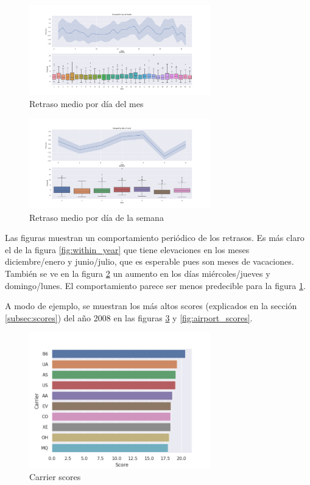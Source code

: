 \begin{figure}[hbtp]
  \centering
  \includegraphics[width=0.7\textwidth]{plots/within_month.png}
  \caption{Retraso medio por d\'ia del mes}
  \label{fig:within_month}
\end{figure}

\begin{figure}[hbtp]
  \centering
  \includegraphics[width=0.7\textwidth]{plots/within_week.png}
  \caption{Retraso medio por d\'ia de la semana}
  \label{fig:within_week}
\end{figure}

Las figuras muestran un comportamiento peri\'odico de los retrasos. Es m\'as claro el de la figura \ref{fig:within_year}
que tiene elevaciones en los meses diciembre/enero y junio/julio, que es esperable pues son
meses de vacaciones. Tambi\'en se ve en la figura \ref{fig:within_week} un aumento en los d\'ias mi\'ercoles/jueves
y domingo/lunes. El comportamiento parece ser menos predecible para la figura \ref{fig:within_month}.

A modo de ejemplo, se muestran los m\'as altos scores
(explicados en la secci\'on \ref{subsec:scores}) del a\~no 2008
en las figuras \ref{fig:carrier_scores} y \ref{fig:airport_scores}.

\begin{figure}[hbtp]
  \centering
  \includegraphics[width=0.7\textwidth]{plots/carrier_scores_2008.png}
  \caption{Carrier scores}
  \label{fig:carrier_scores}
\end{figure}

